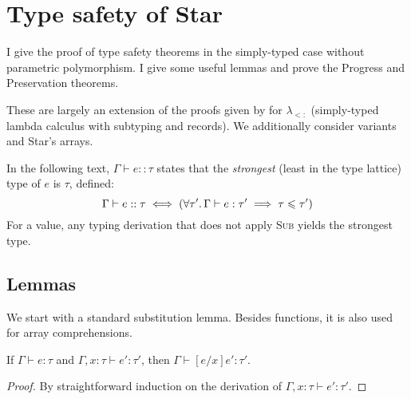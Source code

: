 \chapter{Type safety of Star}
\label{extra:star-proofs}

I give the proof of type safety theorems in the simply-typed case without parametric polymorphism. I give some useful lemmas and prove the Progress and Preservation theorems.

These are largely an extension of the proofs given by \textcite{tapl} for $\lambda_{<:}$ (simply-typed lambda calculus with subtyping and records). We additionally consider variants and Star's arrays.

In the following text, $\Gamma \vdash e :: \tau$ states that the \textit{strongest} (least in the type lattice) type of $e$ is $\tau$, defined: 
$$ \Gamma \vdash e :: \tau \iff \left( \forall \tau' \ldotp \Gamma \vdash e : \tau' \implies \tau \sub \tau' \right) $$ 
For a value, any typing derivation that does not apply \textsc{Sub} yields the strongest type.

\section{Lemmas}

We start with a standard substitution lemma. Besides functions, it is also used for array comprehensions.
\begin{lemma}[Substitution]
    If $\Gamma \vdash e : \tau$ and $\Gamma, x : \tau \vdash e' : \tau'$, then $\Gamma \vdash [e/x]e' : \tau'$.
\end{lemma}
\begin{proof}
By straightforward induction on the derivation of $\Gamma, x : \tau \vdash e' : \tau'$. 
\end{proof}

